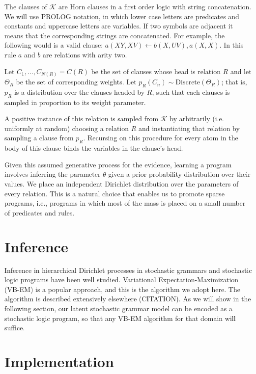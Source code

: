 \documentclass[11pt, twocolumn]{article}
\begin{document}
The clauses of $\mathcal{K}$ are Horn clauses in a first order logic
with string concatenation. We will use PROLOG notation, in which lower
case letters are predicates and constants and uppercase letters are
variables. If two symbols are adjacent it means that the corresponding
strings are concatenated. For example, the following would is a valid
clause: $a(XY, XV) \leftarrow b(X, UV), a(X, X)$. In this rule $a$ and
$b$ are relations with arity two.

Let $C_1, \dots, C_{N(R)} = C(R)$ be the set of clauses whose head is
relation $R$ and let $\Theta_R$ be the set of corresponding
weights. Let $p_R(C_n) \sim \text{Discrete}(\Theta_R)$; that is, $p_R$
is a distribution over the clauses headed by $R$, such that each
clauses is sampled in proportion to its weight parameter.

A positive instance of this relation is sampled from $\mathcal{K}$ by
arbitrarily (i.e. uniformly at random) choosing a relation $R$ and
instantiating that relation by sampling a clause from $p_R$. Recursing
on this procedure for every atom in the body of this clause binds the
variables in the clause's head. 

Given this assumed generative process for the evidence, learning a
program involves inferring the parameter $\theta$ given a prior
probability distribution over their values. We place an independent
Dirichlet distribution over the parameters of every relation. This is
a natural choice that enables us to promote sparse programs, i.e.,
programs in which most of the mass is placed on a small number of
predicates and rules.

\section{Inference}
Inference in hierarchical Dirichlet processes in stochastic grammars
and stochastic logic programs have been well studied. Variational
Expectation-Maximization (VB-EM) is a popular approach, and this is
the algorithm we adopt here. The algorithm is described extensively
elsewhere (CITATION). As we will show in the following section, our
latent stochastic grammar model can be encoded as a stochastic logic
program, so that any VB-EM algorithm for that domain will suffice. 

\section{Implementation}
\end{document}
